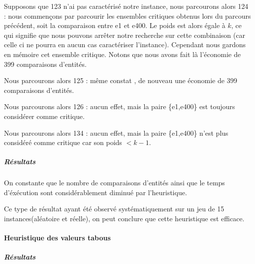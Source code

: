 Supposons que 123 n'ai pas caractérisé notre instance, nous parcourons alors 124 : nous commençons par parcourir les ensembles critiques obtenus lors du parcours précédent, soit la comparaison entre e1 et e400. Le poids est alors égale à $k$, ce qui signifie que nous pouvons arrêter notre recherche sur cette combinaison (car celle ci ne pourra en aucun cas caractériser l'instance). Cependant nous gardons en mémoire cet ensemble critique. Notons que nous avons fait là l'économie de 399 comparaisons d'entités.

Nous parcourons alors 125 : même constat , de nouveau une économie de 399 comparaisons d'entités.

Nous parcourons alors 126 : aucun effet, mais la paire \{e1,e400\} est toujours considérer comme critique.

Nous parcourons alors 134 : aucun effet, mais la paire  \{e1,e400\} n'est plus considéré comme critique car son poids $<k-1$.

\subparagraph{Résultats}
%	
%	
%
%	
%	

On constante que le nombre de comparaisons d'entités ainsi que le temps d'éxécution sont considérablement diminué par l'heuristique.

Ce type de résultat ayant été observé systématiquement sur un jeu de 15 instances(aléatoire et réelle), on peut conclure que cette heuristique est efficace.

\paragraph{Heuristique des valeurs tabous}
\subparagraph{Résultats}

